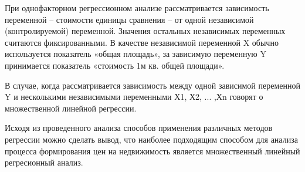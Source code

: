 При однофакторном регрессионном анализе рассматривается зависимость переменной – стоимости единицы сравнения – от одной
независимой (контролируемой) переменной. Значения остальных независимых переменных считаются фиксированными.
В качестве независимой переменной X обычно используется показатель «общая площадь», за зависимую переменную Y
принимается показатель «стоимость 1м кв. общей площади».

В случае, когда рассматривается зависимость между одной зависимой переменной Y и несколькими независимыми
переменными Х1, Х2, ... ,Хn говорят о множественной линейной регрессии. 

Исходя из проведенного анализа способов применения различных методов регрессии можно сделать вывод, что наиболее
подходящим способом для анализа процесса формирования цен на недвижимость является множественный линейный регресионный
анализ.


\pagebreak
